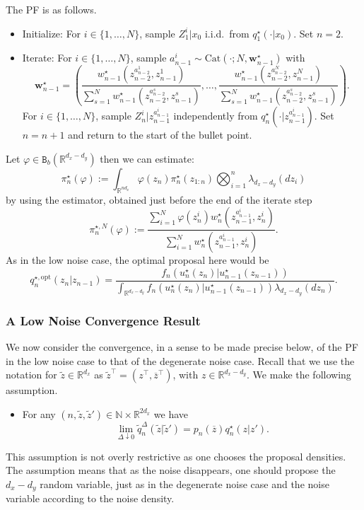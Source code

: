 \documentclass[english,13pt]{article}
\numberwithin{equation}{section}
\newcounter{hypA}
\newenvironment{hypA}{\refstepcounter{hypA}\begin{itemize}
  \item[({\bf A\arabic{hypA}})]}{\end{itemize}}
\begin{document}
The PF is as follows.
\begin{itemize}
\item{Initialize: For $i\in\{1,\dots,N\}$,  sample $Z_1^i|x_0$ i.i.d.~from $q_1^{\star}(\cdot|x_0)$. Set $n=2$.}
\item{Iterate: For $i\in\{1,\dots,N\}$,  sample $a_{n-1}^i\sim\text{Cat}(\cdot;N,\mathbf{w}^\star_{n-1})$ with
$$
\mathbf{w}^\star_{n-1}=\left ( \frac{w_{n-1}^{\star}(z_{n-2}^{a_{n-2}^1},z_{n-1}^{1})}
{\sum_{s=1}^N w_{n-1}^{\star}(z_{n-2}^{a_{n-2}^s},z_{n-1}^s)},\ldots, \frac{w_{n-1}^{\star}(z_{n-2}^{a_{n-2}^N},z_{n-1}^{N})}
{\sum_{s=1}^N w_{n-1}^{\star}(z_{n-2}^{a_{n-2}^s},z_{n-1}^s)}\right).
$$
%
For $i\in\{1,\dots,N\}$,  sample $Z_n^i|z_{n-1}^{a_{n-1}^i}$ independently from $q_n^{\star}(\cdot|z_{n-1}^{a_{n-1}^i})$.
Set $n=n+1$ and return to the start of the bullet point.}
\end{itemize}
Let $\varphi\in\mathtt{B}_b(\mathbb{R}^{d_x-d_y})$ then we can estimate:
$$
\pi_n^{\star}(\varphi) := \int_{\mathbb{R}^{nd_x}}\varphi(z_n) \pi_n^{\star}(z_{1:n})
\bigotimes_{i=1}^n \lambda_{d_x-d_y}(dz_i)
$$
by using the estimator, obtained just before the end of the iterate step
$$
\pi_n^{\star,N}(\varphi) := \frac{\sum_{i=1}^N \varphi(z_n^i)
w_{n}^{\star}(z_{n-1}^{a_{n-1}^i},z_{n}^{i})}
{\sum_{i=1}^N
w_{n}^{\star}(z_{n-1}^{a_{n-1}^i},z_{n}^{i})}.
$$
As in the low noise case,  the optimal proposal here would be
$$
q_n^{\star,\text{opt}}(z_n|z_{n-1}) = 
\frac{f_n(u_n^{\star}(z_n)|u_{n-1}^{\star}(z_{n-1}))}
{\int_{\mathbb{R}^{d_x-d_y}}
f_n(u_n^{\star}(z_n)|u_{n-1}^{\star}(z_{n-1}))\lambda_{d_x-d_y}(dz_n)
}.
$$

\subsubsection{A Low Noise Convergence Result}

We now consider the convergence,  in a sense to be made precise below,  of the PF in the low noise case to that of the degenerate noise case.  
Recall that we use the notation for $\widetilde{z}\in\mathbb{R}^{d_x}$ as $\widetilde{z}^{\top}=(z^{\top},\overline{z}^{\top})$, with $z\in\mathbb{R}^{d_x-d_y}$.
We make the following assumption.
\begin{hypA}\label{ass:1}
For any $(n,\widetilde{z},\widetilde{z}')\in\mathbb{N}\times\mathbb{R}^{2d_x}$ we have
$$
\lim_{\Delta\downarrow 0} \widetilde{q}_n^{\Delta}(\widetilde{z}|\widetilde{z}') = 
p_n(\overline{z}) q_n^{\star}(z|z').
$$
\end{hypA}
This assumption is not overly restrictive as one chooses the proposal densities.  The assumption means that as the noise disappears,  one should propose the $d_x-d_y$ random variable,  just as in the degenerate noise case and the noise variable according to the noise density.
\end{document}
